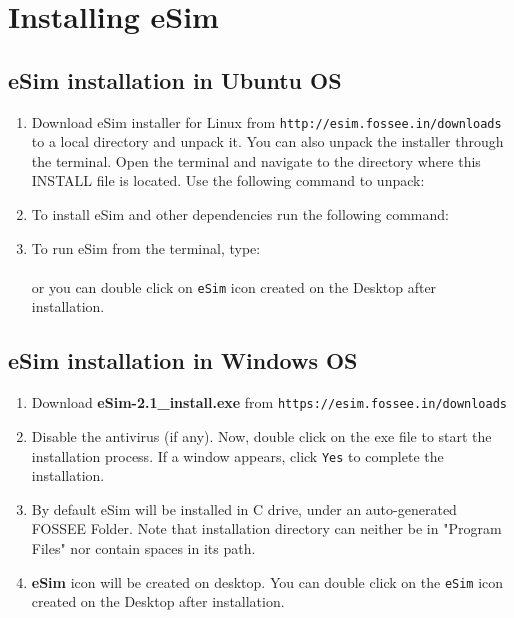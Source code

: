 \chapter{Installing eSim}
\thispagestyle{empty}
\label{chap3}

\section {eSim installation in Ubuntu OS}
\begin{enumerate}
\item Download eSim installer for Linux from {\tt http://esim.fossee.in/downloads} to a local directory and unpack it. You can also unpack the  installer through the terminal. Open the terminal and navigate to the directory where this INSTALL file is located. Use the following command to unpack:
\\
\item To install eSim and other dependencies run the following command:
\\
\item To run eSim from the terminal, type:  
\\
\\
  or you can double click on {\tt eSim} icon created on the Desktop after installation.
\end{enumerate}


\section {eSim installation in Windows OS}
\begin{enumerate}
\item Download \textbf{eSim-2.1\_install.exe} from  {\tt https://esim.fossee.in/downloads}
\item Disable the antivirus (if any). Now, double click on the exe file to start the installation process. If a window appears, click {\tt Yes} to complete the installation.
\item By default eSim will be installed in C drive, under an auto-generated FOSSEE Folder. Note that installation directory can neither be in "Program Files" nor contain spaces in its path.
\item \textbf{eSim} icon will be created on desktop. You can double click on the {\tt eSim} icon created on the Desktop after installation.
\end{enumerate}

